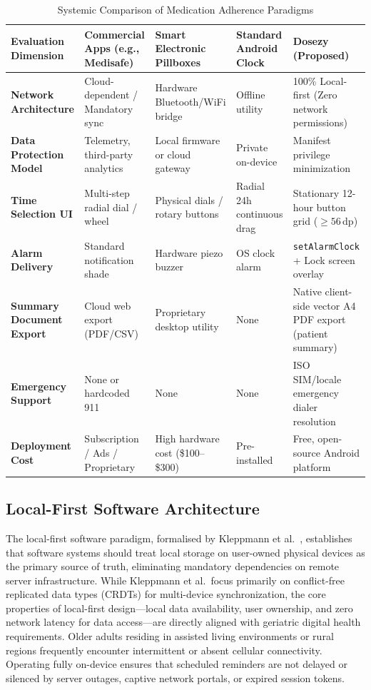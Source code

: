 \documentclass[11pt,a4paper]{article}
\begin{document}
\begin{table}[t]
\centering
\small
\caption{Systemic Comparison of Medication Adherence Paradigms}
\label{tab:comparison_matrix}
\begin{tabularx}{\textwidth}{lXXXX}
\toprule
\textbf{Evaluation Dimension} & \textbf{Commercial Apps (e.g., Medisafe)} & \textbf{Smart Electronic Pillboxes} & \textbf{Standard Android Clock} & \textbf{Dosezy (Proposed)} \\
\midrule
\textbf{Network Architecture} & Cloud-dependent / Mandatory sync & Hardware Bluetooth/WiFi bridge & Offline utility & 100\% Local-first (Zero network permissions) \\
\textbf{Data Protection Model} & Telemetry, third-party analytics & Local firmware or cloud gateway & Private on-device & Manifest privilege minimization \\
\textbf{Time Selection UI} & Multi-step radial dial / wheel & Physical dials / rotary buttons & Radial 24h continuous drag & Stationary 12-hour button grid ($\ge 56\,\text{dp}$) \\
\textbf{Alarm Delivery} & Standard notification shade & Hardware piezo buzzer & OS clock alarm & \texttt{setAlarmClock} + Lock screen overlay \\
\textbf{Summary Document Export} & Cloud web export (PDF/CSV) & Proprietary desktop utility & None & Native client-side vector A4 PDF export (patient summary) \\
\textbf{Emergency Support} & None or hardcoded 911 & None & None & ISO SIM/locale emergency dialer resolution \\
\textbf{Deployment Cost} & Subscription / Ads / Proprietary & High hardware cost (\$100--\$300) & Pre-installed & Free, open-source Android platform \\
\bottomrule
\end{tabularx}
\end{table}

\subsection{Local-First Software Architecture}

The local-first software paradigm, formalised by Kleppmann et al.~\cite{kleppmann2019local}, establishes that software systems should treat local storage on user-owned physical devices as the primary source of truth, eliminating mandatory dependencies on remote server infrastructure. While Kleppmann et al.\ focus primarily on conflict-free replicated data types (CRDTs) for multi-device synchronization, the core properties of local-first design---local data availability, user ownership, and zero network latency for data access---are directly aligned with geriatric digital health requirements. Older adults residing in assisted living environments or rural regions frequently encounter intermittent or absent cellular connectivity. Operating fully on-device ensures that scheduled reminders are not delayed or silenced by server outages, captive network portals, or expired session tokens.
\end{document}
